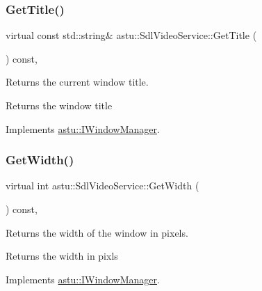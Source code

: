 \subsubsection{\texorpdfstring{Get\+Title()}{GetTitle()}}
{\footnotesize\ttfamily virtual const std\+::string\& astu\+::\+Sdl\+Video\+Service\+::\+Get\+Title (\begin{DoxyParamCaption}{ }\end{DoxyParamCaption}) const\hspace{0.3cm}{\ttfamily [override]}, {\ttfamily [virtual]}}

Returns the current window title.

\begin{DoxyReturn}{Returns}
the window title 
\end{DoxyReturn}


Implements \hyperlink{classastu_1_1IWindowManager_aa5733f1ceda60796f6e35f5f7b79ffa9}{astu\+::\+I\+Window\+Manager}.

\mbox{\label{classastu_1_1SdlVideoService_a45c3181611e718bcfe44862baed6d520}} 
\subsubsection{\texorpdfstring{Get\+Width()}{GetWidth()}}
{\footnotesize\ttfamily virtual int astu\+::\+Sdl\+Video\+Service\+::\+Get\+Width (\begin{DoxyParamCaption}{ }\end{DoxyParamCaption}) const\hspace{0.3cm}{\ttfamily [override]}, {\ttfamily [virtual]}}

Returns the width of the window in pixels.

\begin{DoxyReturn}{Returns}
the width in pixls 
\end{DoxyReturn}


Implements \hyperlink{classastu_1_1IWindowManager_a6f818a88754bde33c3121e7413d3a554}{astu\+::\+I\+Window\+Manager}.

\mbox{\label{classastu_1_1SdlVideoService_a6d6085e9ff213c5d41546d604ff53e92}} 
